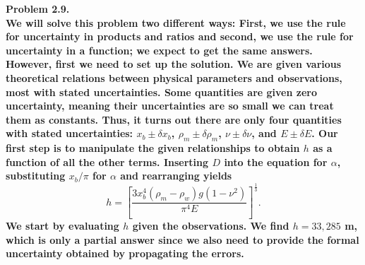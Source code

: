 \bf{Problem 2.9.}\\

We will solve this problem two different ways: First, we use the rule for uncertainty in products and ratios
and second, we use the rule for uncertainty in a function; we expect to get the same answers.  However, first we need to set up the solution.
We are given various theoretical relations between physical parameters and observations, most with stated
uncertainties.  Some quantities are given zero uncertainty, meaning their uncertainties are so small we can
treat them as constants.  Thus, it turns out there are only four quantities with stated uncertainties:
$x_b \pm \delta x_b$, $\rho_m \pm \delta \rho_m$, $\nu \pm \delta \nu$, and $E \pm \delta E$.  Our
first step is to manipulate the given relationships to obtain $h$ as a function of all the other terms.
Inserting $D$ into the equation for $\alpha$, substituting $x_b/\pi$ for $\alpha$ and
rearranging yields
$$
h = \left [ \frac{3 x_b^4 (\rho_m - \rho_w)g(1 - \nu^2)}{\pi^4 E} \right ]^\frac{1}{3}.
$$
We start by evaluating $h$ given the observations.  We find $h = 33,285$ m,
which is only a partial answer since we also need to provide the formal uncertainty
obtained by propagating the errors.

